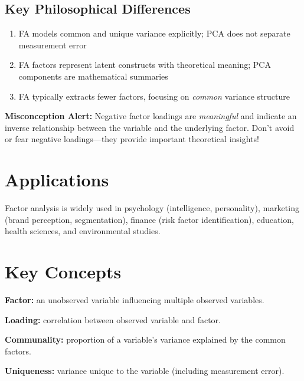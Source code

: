 \documentclass[a4paper]{tufte-book}
\begin{document}

\subsection{Key Philosophical Differences}
\begin{enumerate}[leftmargin=*,itemsep=0.8em]
  \item {} FA models common and unique variance explicitly; PCA does not separate measurement error
  \item {} FA factors represent latent constructs with theoretical meaning; PCA components are mathematical summaries
  \item {} FA typically extracts fewer factors, focusing on \textit{common} variance structure
\end{enumerate}

\begin{commonissue}
\textbf{Misconception Alert:} Negative factor loadings are \textit{meaningful} and indicate an inverse relationship between the variable and the underlying factor. Don't avoid or fear negative loadings—they provide important theoretical insights!
\end{commonissue}

\section{Applications}
Factor analysis is widely used in psychology (intelligence, personality), marketing (brand perception, segmentation), finance (risk factor identification), education, health sciences, and environmental studies.

\section{Key Concepts}

\textbf{Factor:} an unobserved variable influencing multiple observed variables.

\textbf{Loading:} correlation between observed variable and factor.

\textbf{Communality:} proportion of a variable's variance explained by the common factors.

\textbf{Uniqueness:} variance unique to the variable (including measurement error).
\end{document}
